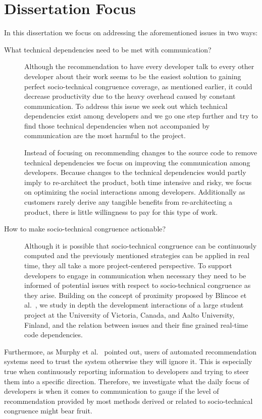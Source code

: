 \section{Dissertation Focus}
In this dissertation we focus on addressing the aforementioned issues in two ways:
\begin{description}
\item[What technical dependencies need to be met with communication?] 
Although the recommendation to have every developer talk to every other developer about their work seems to be the easiest solution to gaining perfect socio-technical congruence coverage, as mentioned earlier, it could decrease productivity due to the heavy overhead caused by  constant communication.
To address this issue we seek out which technical dependencies exist among developers and we go one step further and try to find those technical dependencies when not accompanied by communication are the most harmful to the project.

Instead of focusing on recommending changes to the source code to remove technical dependencies we focus on improving the communication among developers.
Because changes to the technical dependencies would partly imply to re-architect the product, both time intensive and risky, we focus on optimizing the social interactions among developers.
Additionally as customers rarely derive any tangible benefits from re-architecting a product, there is little willingness to pay for this type of work.

\item[How to make socio-technical congruence actionable?] Although it is possible that socio-technical congruence can be continuously computed and the previously mentioned strategies can be applied in real time, they all take a more project-centered perspective.
To support developers to engage in communication when necessary they need to be informed of potential issues with respect to socio-technical congruence as they arise.
Building on the concept of proximity proposed by Blincoe et al.~\cite{blincoe:cscw:2012}, we study in depth the development interactions of a large student project at the University of Victoria, Canada, and Aalto University, Finland, and the relation between issues and their fine grained real-time code dependencies.
\end{description}

Furthermore, as Murphy et al.~\cite{murphy:rsse:2010} pointed out, users of automated recommendation systems need to trust the system otherwise they will ignore it.
This is especially true when continuously reporting information to developers and trying to steer them into a specific direction.
Therefore, we investigate what the daily focus of developers is when it comes to communication to gauge if the level of recommendation provided by most methods derived or related to socio-technical congruence might bear fruit.




